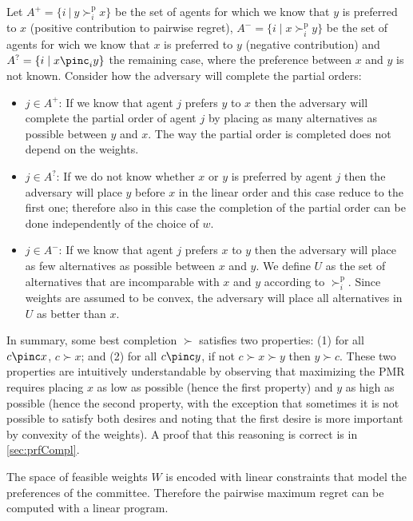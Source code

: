 \documentclass[12pt]{article}
\newcommand{\pref}{\succ}%
\newcommand{\ppref}{\succ^\text{p}}%
\begin{document}
Let $A^+=\{ i \ | \ y \ppref_i x\}$ be the set of agents for which we know that $y$ is preferred to $x$ (positive contribution to pairwise regret), $A^-=\{ i \mid x \ppref_i y\}$ 
be the set of agents for wich we  know that $x$ is preferred to $y$ (negative contribution) and $A^?=\{ i \mid x \pinc_i y\}$ the remaining case, where the preference between $x$ and $y$ is not known.
Consider how the adversary will complete the partial orders:
\begin{itemize}
 \item $j \in A^+$: If we know that agent $j$ prefers $y$ to $x$ then the adversary will complete the partial order of agent $j$ by placing as many alternatives as possible between $y$ and $x$.
 The way the partial order is completed does not depend on the weights.

 \item $j \in A^?$: If we do not know whether $x$ or $y$ is preferred by agent $j$ then the adversary will place $y$ before $x$ in the linear order and this case reduce to the first one; therefore also in this case the completion of the partial order can be done independently of the choice of $w$.

 \item $j \in A^-$: If we know that agent $j$ prefers $x$ to $y$ then the adversary will place as few alternatives as possible between $x$ and $y$.
 We define $U$ as the set of alternatives that are incomparable with $x$ and $y$ according to $\ppref_i$. Since weights are assumed to be convex, the adversary will place all alternatives in $U$ as better than $x$.
\end{itemize}
In summary, some best completion $\pref$ satisfies two properties: (1) for all $c \pinc x$, $c \pref x$; and (2) for all $c \pinc y$, if not $c \pref x \pref y$ then $y \pref c$. These two properties are intuitively understandable by observing that maximizing the PMR requires placing $x$ as low as possible (hence the first property) and $y$ as high as possible (hence the second property, with the exception that sometimes it is not possible to satisfy both desires and noting that the first desire is more important by convexity of the weights). A proof that this reasoning is correct is in \cref{sec:prfCompl}.

The space of feasible weights $W$ is encoded with linear constraints that model the preferences of the committee.
Therefore the pairwise maximum regret can be computed with a linear program.
 
\end{document}
